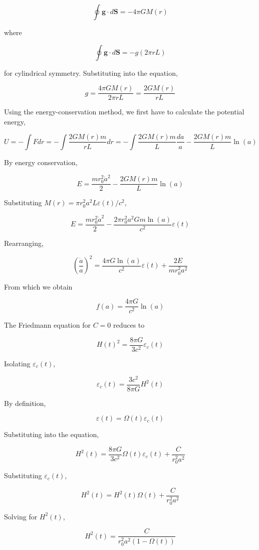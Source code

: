 \documentclass[11pt]{article}
\begin{document}
\begin{pproblem}
\begin{pssolution*}{}{ }
\begin{alternativas}
        \[\oint \mathbf{g} \cdot d\mathbf{S} = -4\pi G M(r)\]

        where

        \[\oint \mathbf{g} \cdot d\mathbf{S} = -g(2\pi r L)\]

        for cylindrical symmetry. Substituting into the equation,

        \[g = \frac{4\pi G M(r)}{2\pi r L} = \frac{2G M(r)}{r L}\]

        Using the energy-conservation method, we first have to calculate the potential energy,

        \[U = -\int F dr = -\int \frac{2GM(r)m}{rL} dr = -\int \frac{2GM(r)m}{L} \frac{da}{a} - \frac{2GM(r)m}{L} \ln(a)\]

        By energy conservation,

        \[E = \frac{m r_0^2 \dot{a}^2}{2} - \frac{2GM(r)m}{L} \ln(a)\]

        Substituting \(M(r) = \pi r_0^2 a^2 L \varepsilon(t)/c^2\),

        \[E = \frac{m r_0^2 \dot{a}^2}{2} - \frac{2\pi r_0^2 a^2 G m \ln(a)}{c^2} \varepsilon(t)\]

        Rearranging,

        \[\left(\frac{\dot{a}}{a}\right)^2 = \frac{4\pi G \ln(a)}{c^2} \varepsilon(t) + \frac{2E}{mr_0^2 a^2}\]

        From which we obtain

        \[\boxed{f(a) = \frac{4\pi G}{c^2} \ln(a)}\]

        \item The Friedmann equation for \(C = 0\) reduces to

        \[H(t)^2 = \frac{8\pi G}{3c^2} \varepsilon_c(t)\]

        Isolating \(\varepsilon_c(t)\),

        \[\boxed{\varepsilon_c(t) = \frac{3c^2}{8\pi G} H^2(t)}\]

        By definition,

        \[\varepsilon(t) = \Omega (t) \varepsilon_c(t)\]

        Substituting into the equation,

        \[H^2(t) = \frac{8\pi G}{3c^2} \Omega(t) \varepsilon_c(t) + \frac{C}{r_0^2 a^2}\]

        Substituting \(\varepsilon_c(t)\),

        \[H^2(t) = H^2(t) \Omega(t) + \frac{C}{r_0^2 a^2}\]

        Solving for \(H^2(t)\),

        \[\boxed{H^2(t) = \frac{C}{r_0^2 a^2 (1 - \Omega(t))}}\]
    \end{alternativas}
\end{pssolution*}
\end{pproblem}
\end{document}
